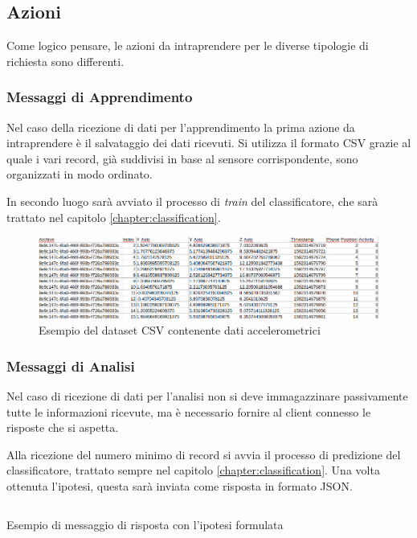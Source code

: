 \newpage
\subsection{Azioni}
Come logico pensare, le azioni da intraprendere per le diverse tipologie di richiesta sono differenti. 

\subsubsection{Messaggi di Apprendimento}
Nel caso della ricezione di dati per l'apprendimento la prima azione da intraprendere è il salvataggio dei dati ricevuti.
Si utilizza il formato CSV grazie al quale i vari record, già suddivisi in base al sensore corrispondente, sono organizzati in modo ordinato. 

In secondo luogo sarà avviato il processo di \textit{train} del classificatore, che sarà trattato nel capitolo \ref{chapter:classification}.
\begin{figure}[H]
    \centering
    \includegraphics[scale = 0.40]{assets/images/examples/dataset-data-example.png}
    \caption{Esempio del dataset CSV contenente dati accelerometrici}
\end{figure}


\subsubsection{Messaggi di Analisi}
Nel caso di ricezione di dati per l'analisi non si deve immagazzinare passivamente tutte le informazioni ricevute, ma è necessario fornire
al client connesso le risposte che si aspetta.

Alla ricezione del numero minimo di record si avvia il processo di predizione del classificatore, trattato sempre nel capitolo \ref{chapter:classification}.
Una volta ottenuta l'ipotesi, questa sarà inviata come risposta in formato JSON.

\begin{listing}[H] 
    \inputminted[frame=single,framesep=10pt]{json}{snippets/server/receiver/prediction.json}
    \caption{Esempio di messaggio di risposta con l'ipotesi formulata}
\end{listing}